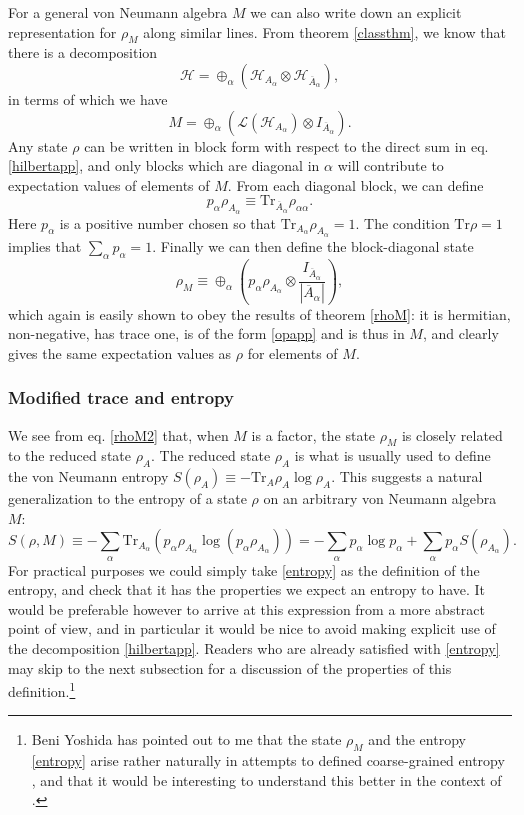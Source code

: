 \documentclass[12pt]{article}
\newcommand{\be}{\begin{equation}}
\newcommand{\ee}{\end{equation}}
\newcommand{\Tr}{\mathrm{Tr}}
\newcommand{\Ll}{\mathcal{L}}
\newcommand{\Hh}{\mathcal{H}}
\newcommand{\Ab}{\ol{A}}
\newcommand{\ol}{\overline}
\begin{document}
For a general von Neumann algebra $M$ we can also write down an explicit representation for $\rho_M$ along similar lines.  From theorem \eqref{classthm}, we know that there is a decomposition 
\be\label{hilbertapp}
\Hh=\oplus_\alpha \left(\mathcal{H}_{A_\alpha}\otimes \mathcal{H}_{\ol{A}_\alpha}\right),
\ee
in terms of which we have
\be\label{opapp}
M=\oplus_\alpha\left(\Ll\left(\mathcal{H}_{A_\alpha}\right)\otimes I_{\ol{A}_\alpha}\right).
\ee
Any state $\rho$ can be written in block form with respect to the direct sum in eq. \eqref{hilbertapp}, and only blocks which are diagonal in $\alpha$ will contribute to expectation values of elements of $M$.  From each diagonal block, we can define
\be
p_\alpha\rho_{A_\alpha}\equiv \Tr_{\Ab_{\alpha}}\rho_{\alpha \alpha}.
\ee
Here $p_\alpha$ is a positive number chosen so that $\Tr_{A_\alpha} \rho_{A_\alpha}=1$.  The condition $\Tr \rho=1$ implies that $\sum_\alpha p_\alpha=1$.  Finally we can then define the block-diagonal state
\be\label{rhoM3}
\rho_M\equiv \oplus_\alpha \left(p_\alpha\rho_{A_\alpha}\otimes \frac{I_{\Ab_\alpha}}{|\Ab_\alpha|}\right),
\ee
which again is easily shown to obey the results of theorem \eqref{rhoM}: it is hermitian, non-negative, has trace one, is of the form \eqref{opapp} and is thus in $M$, and clearly gives the same expectation values as $\rho$ for elements of $M$.

\subsubsection{Modified trace and entropy}
We see from eq. \eqref{rhoM2} that, when $M$ is a factor, the state $\rho_M$ is closely related to the reduced state $\rho_A$.  The reduced state $\rho_A$ is what is usually used to define the von Neumann entropy $S(\rho_A)\equiv -\Tr_A \rho_A \log \rho_A$.  This suggests a natural generalization to the entropy of a state $\rho$ on an arbitrary von Neumann algebra $M$:
\be\label{entropy}
S(\rho,M)\equiv -\sum_\alpha \Tr_{A_\alpha} \left(p_\alpha \rho_{A_\alpha}\log (p_\alpha \rho_{A_\alpha})\right)=-\sum_\alpha p_\alpha \log p_\alpha +\sum_{\alpha}p_\alpha S(\rho_{A_\alpha}).
\ee
For practical purposes we could simply take \eqref{entropy} as the definition of the entropy, and check that it has the properties we expect an entropy to have.  It would be preferable however to arrive at this expression from a more abstract point of view, and in particular it would be nice to avoid making explicit use of the decomposition \eqref{hilbertapp}. Readers who are already satisfied with \eqref{entropy} may skip to the next subsection for a discussion of the properties of this definition.\footnote{Beni Yoshida has pointed out to me that the state $\rho_M$ and the entropy \eqref{entropy} arise rather naturally in attempts to defined coarse-grained entropy \cite{GellMann:2006uj}, and that it would be interesting to understand this better in the context of \cite{Kelly:2013aja}.}
\end{document}
